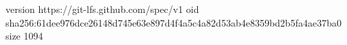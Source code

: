 version https://git-lfs.github.com/spec/v1
oid sha256:61dee976dce26148d745e63e897d4f4a5c4a82d53ab4e8359bd2b5fa4ae37ba0
size 1094
